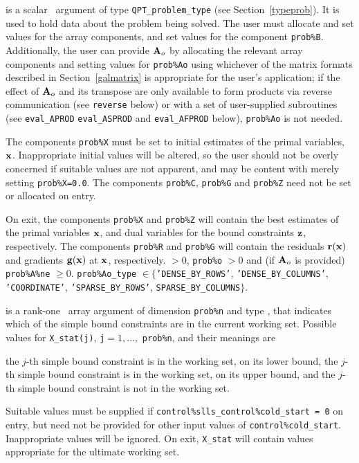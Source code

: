\documentclass{galahad}
\begin{document}
\vspace*{-3mm}
\begin{description}
 is a scalar \intentinout\ argument of type
{\tt QPT\_problem\_type}
(see Section~\ref{typeprob}).
It is used to hold data about the problem being solved.
The user must allocate and set values for the array components,
and set values for the component {\tt prob\%B}.
Additionally, the user can provide ${\mathbf{A}}_o$ by allocating the
relevant array components and setting values for {\tt prob\%Ao}
using whichever
of the matrix formats described in Section~\ref{galmatrix}
is appropriate for the user's application;
if the effect of ${\mathbf{A}}_o$ and its transpose are only available to form products
via reverse communication (see {\tt reverse} below)
or with a set of user-supplied subroutines (see {\tt eval\_APROD}
{\tt eval\_ASPROD} and {\tt eval\_AFPROD} below), {\tt prob\%Ao} is not needed.

The components {\tt prob\%X}
must be set to initial estimates of the primal variables, ${\mathbf{x}}$.
Inappropriate initial values will be altered, so the user should
not be overly concerned if suitable values are not apparent, and may be
content with merely setting {\tt prob\%X=0.0}.
The components {\tt prob\%C}, {\tt prob\%G} and {\tt prob\%Z}
need not be set or allocated on entry.

On exit, the components {\tt prob\%X} and {\tt prob\%Z}
will contain the best estimates of the primal variables ${\mathbf{x}}$,
and dual variables for the bound constraints ${\mathbf{z}}$, respectively.
The components {\tt prob\%R} and {\tt prob\%G}
will contain the residuals ${\mathbf{r}}({\mathbf{x}})$
and gradients ${\mathbf{g}}({\mathbf{x}})$ at ${\mathbf{x}}$, respectively.
 $> 0$, {\tt prob\%o} $> 0$
              and (if ${\mathbf{A}}_o$ is provided) {\tt prob\%A\%ne} $\geq 0$.
              {\tt prob\%Ao\_type} $\in 
               \{${\tt 'DENSE\_BY\_ROWS'}, {\tt 'DENSE\_BY\_COLUMNS'},
                  {\tt 'COORDINATE'}, {\tt 'SPARSE\_BY\_\-ROWS'}, 
                  {\tt SPARSE\_BY\_COLUMNS}$\}$.

 is a rank-one \intentinout\ array argument of dimension {\tt prob\%n}
and type \integer, that indicates which of the simple bound
constraints are in the current working set. Possible values for
{\tt X\_stat(j)}, {\tt j}$=1, \ldots ,$ {\tt prob\%n}, and their meanings are
\begin{description}
 the $j$-th simple bound constraint
is in the working set, on its lower bound,
 the $j$-th simple bound constraint
is in the working set, on its upper bound, and
  the $j$-th simple bound constraint is not in the working set.
\end{description}
Suitable values must be supplied if
{\tt control\%slls\_control\%cold\_start = 0} on entry,
but need not be provided for other input values of {\tt control\%cold\_start}.
Inappropriate values will be ignored.
On exit, {\tt X\_stat} will contain values appropriate for the ultimate
working set.


\end{description}
\end{document}
